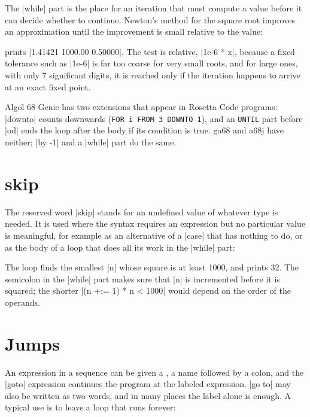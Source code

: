 The \code|while| part is the place for an iteration that must compute a
value before it can decide whether to continue. Newton's method for the
square root improves an approximation until the improvement is small
relative to the value:


\noindent prints \code|1.41421 1000.00 0.50000|. The test is relative,
\code|1e-6 * x|, because a fixed tolerance such as \code|1e-6| is far too
coarse for very small roots, and for large ones, with only 7
significant digits, it is reached only if the iteration happens to
arrive at an exact fixed point.

\begin{implnote}
Algol 68 Genie has two extensions that appear in Rosetta Code programs:
\code|downto| counts downwards (\texttt{FOR i FROM 3 DOWNTO 1}), and an
\texttt{UNTIL} part before \code|od| ends the loop after the body if its
condition is true. ga68 and a68j have neither; \code|by -1| and a
\code|while| part do the same.
\end{implnote}

\section{\textbf{skip}}\label{sec-skip}

The reserved word \code|skip| stands for an undefined value of whatever
type is needed. It is used where the syntax requires an expression but
no particular value is meaningful, for example as an alternative of a
\code|case| that has nothing to do, or as the body of a loop that does
all its work in the \code|while| part:


\noindent The loop finds the smallest \code|n| whose square is at least
1000, and prints 32. The semicolon in the \code|while| part makes sure
that \code|n| is incremented before it is squared; the shorter
\code|(n +:= 1) * n < 1000| would depend on the order of the operands.

\section{Jumps}\label{sec-jumps}

An expression in a sequence can be given a , a name followed
by a colon, and the \code|goto| expression continues the program at the
labeled expression. \code|go to| may also be written as two words, and in
many places the label alone is enough. A typical use is to leave a loop
that runs forever:

